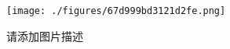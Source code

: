 
\begin{figure}[ht]
\centering
\texttt{[image: ./figures/67d999bd3121d2fe.png]}
\caption{请添加图片描述} \label{fig_testSq_1}
\end{figure}